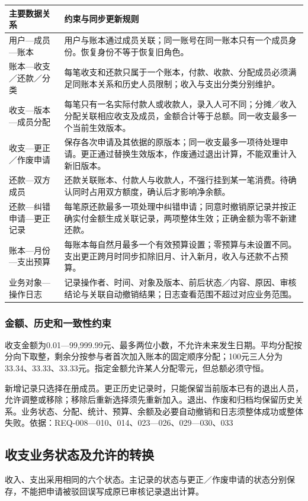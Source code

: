 \documentclass[UTF8,a4paper,11pt,fontset=fandol]{ctexart}
\renewcommand{\arraystretch}{1.3}
\newcommand{\smalltable}{\small\setlength{\tabcolsep}{5pt}\renewcommand{\arraystretch}{1.25}}
\begin{document}
\begin{center}\smalltable
\begin{tabularx}{\linewidth}{p{33mm}Y}
\toprule
{}主要数据关系 & 约束与同步更新规则\\
\midrule
用户—成员—账本 & 用户与账本通过成员关联；同一账号在同一账本只有一个成员身份。恢复身份不等于恢复旧角色。\\
账本—收支／还款／分类 & 每笔收支和还款只属于一个账本，付款、收款、分配成员必须满足同账本关系和历史人员限制；收入与支出分类分别维护。\\
收支—版本—成员分配 & 每笔只有一名实际付款人或收款人，录入人可不同；分摊／收入分配关联相应收支及成员，金额合计等于总额。同一收支最多一个当前生效版本。\\
收支—更正／作废申请 & 保存各次申请及其依据的原版本；同一收支最多一项待处理申请。更正通过替换生效版本，作废通过退出计算，不能双重计入新旧版本。\\
还款—双方成员 & 还款关联账本、付款人与收款人，不强行挂到某一笔消费。待确认同时占用双方额度，确认后才影响净余额。\\
还款—纠错申请—更正记录 & 每笔原还款最多一项处理中纠错申请；同意时撤销原记录并按正确实付金额生成关联记录，两项整体生效；正确金额为零不新建还款。\\
账本—月份—支出预算 & 每账本每自然月最多一个有效预算设置；零预算与未设置不同。支出更正跨月时同步扣除旧月、计入新月，收入与还款不占预算。\\
业务对象—操作日志 & 记录操作者、时间、对象及版本、前后状态／内容、原因、审核结论与关联自动撤销结果；日志查看范围不超过对应业务范围。\\
\bottomrule
\end{tabularx}
\end{center}

\subsubsection{金额、历史和一致性约束}
收支金额为0.01—99,999.99元、最多两位小数，不允许未来发生日期。平均分配按分向下取整，剩余分按参与者首次加入账本的固定顺序分配；100元三人分为33.34、33.33、33.33元。指定金额允许某人分配零元，但总额必须守恒。

新增记录只选择在册成员。更正历史记录时，只能保留当前版本已有的退出人员，允许调整或移除；移除后重新选择须先重新加入。退出、作废和归档均保留历史关系。业务状态、分配、统计、预算、余额及必要自动撤销和日志须整体成功或整体失败。\hfill{\small\color{muted}依据：REQ-008—010、014、023—026、029—030、033}

\newpage
\subsection{收支业务状态及允许的转换}
收入、支出采用相同的六个状态。主记录的状态与更正／作废申请的状态分别保存，不能把申请被驳回误写成原已审核记录退出计算。
\end{document}
